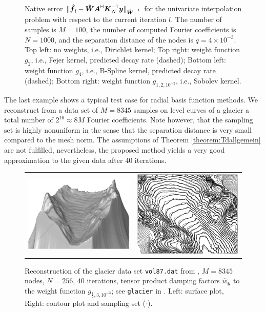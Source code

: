 \documentclass[11pt,a4paper,bibtotoc]{scrartcl}
\newcommand{\zb}[1]{\ensuremath{\boldsymbol{#1}}}
\newcommand{\adj}{{\vdash \hspace*{-1.72mm} \dashv}}
\numberwithin{equation}{section}
\numberwithin{table}{section}
\numberwithin{figure}{section}
\begin{document}
\begin{figure}[ht]
\begin{center}
\begin{tabular}{cc}
    \end{tabular}
  \end{center}
  \caption{Native error $\|\zb {\hat f}_l-\zb {\hat W} \zb A^{\adj} \zb
    K_N^{-1} \zb y\|_{\zb {\hat W}^{-1}}$ for the univariate interpolation
    problem with respect to the current iteration $l$.
    The number of samples is $M=100$, the number of computed Fourier
    coefficients is $N=1000$, and the separation distance of the nodes is
    $q=4\times 10^{-3}$.
    Top left: no weights, i.e., Dirichlet kernel;
    Top right: weight function $g_2$, i.e., Fejer kernel, predicted decay rate
    (dashed);
    Bottom left: weight function $g_4$, i.e., B-Spline kernel, predicted decay rate
    (dashed);
    Bottom right: weight function $g_{1,2,10^{-2}}$, i.e., Sobolev kernel.
    \label{fig:error_decay}}
\end{figure}


The last example shows a typical test case for radial basis function methods.
We reconstruct from a data set of $M=8345$ samples on level curves of a
glacier a total number of $2^{16} \approx 8 M$ Fourier coefficients.
Note however, that the sampling set is highly nonuniform in the sense that the
separation distance is very small compared to the mesh norm.
The assumptions of Theorem \ref{theorem:Tdallgemein} are not fulfilled,
nevertheless, the proposed method yields a very good approximation to the
given data after $40$ iterations.

\begin{figure}[ht!]
  \begin{center}
    \begin{tabular}{cc}
      \includegraphics[width=6cm]{images/glacier1.eps} &
      \includegraphics[width=6cm]{images/glacier2.eps}
    \end{tabular}
  \end{center}
  \caption{Reconstruction of the glacier data set {\tt vol87.dat} from
    \cite{Franke.Daten}, $M=8345$ nodes, $N=256$, $40$ iterations, tensor
    product damping factors $\hat w_{\zb k}$ to the weight function
    $g_{\frac{1}{2},3,10^{-3}}$; see {\tt glacier\/} in \cite{kupo02C}.
    Left: surface plot, Right: contour plot and sampling set
    ($\cdot$).\label{Fig:glacier}}
\end{figure}
\end{document}
